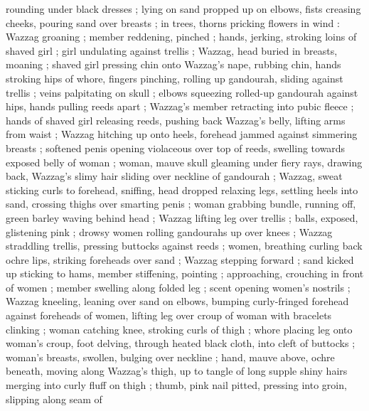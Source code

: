 rounding under black dresses ; lying on sand propped up on elbows, fists creasing cheeks, pouring sand over breasts ; in trees, thorns pricking flowers in wind : Wazzag groaning ; member reddening, pinched ; hands, jerking, stroking loins of shaved girl ; girl undulating against trellis ; Wazzag, head buried in breasts, moaning ; shaved girl pressing chin onto Wazzag's nape, rubbing chin, hands stroking hips of whore, fingers pinching, rolling up gandourah, sliding against trellis ; veins palpitating on skull ; elbows squeezing rolled-up gandourah against hips, hands pulling reeds apart ; Wazzag's member retracting into pubic fleece ; hands of shaved girl releasing reeds, pushing back Wazzag's belly, lifting arms from waist ; Wazzag hitching up onto heels, forehead jammed against simmering breasts ; softened penis opening violaceous over top of reeds, swelling towards exposed belly of woman ; woman, mauve skull gleaming under fiery rays, drawing back, Wazzag's slimy hair sliding over neckline of gandourah ; Wazzag, sweat sticking curls to forehead, sniffing, head dropped relaxing legs, settling heels into sand, crossing thighs over smarting penis ; woman grabbing bundle, running off, green barley waving behind head ; Wazzag lifting leg over trellis ; balls, exposed, glistening pink ; drowsy women rolling gandourahs up over knees ; Wazzag straddling trellis, pressing buttocks against reeds ; women, breathing curling back ochre lips, striking foreheads over sand ; Wazzag stepping forward ; sand kicked up sticking to hams, member stiffening, pointing ; approaching, crouching in front of women ; member swelling along folded leg ; scent opening women's nostrils ; Wazzag kneeling, leaning over sand on elbows, bumping curly-fringed forehead against foreheads of women, lifting leg over croup of woman with bracelets clinking ; woman catching knee, stroking curls of thigh ; whore placing leg onto woman's croup, foot delving, through heated black cloth, into cleft of buttocks ; woman's breasts, swollen, bulging over neckline ; hand, mauve above, ochre beneath, moving along Wazzag's thigh, up to tangle of long supple shiny hairs merging into curly fluff on thigh ; thumb, pink nail pitted, pressing into groin, slipping along seam of 
